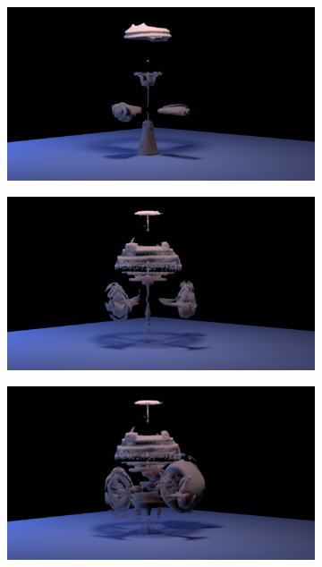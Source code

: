 \documentclass[11pt]{article}
\begin{document}
\begin{figure}
	\begin{subfigure}[h]{0.5\textwidth}
		\centering
		\includegraphics[width=\textwidth]{Figures/renders/plume0007.png}
	\end{subfigure}
	\begin{subfigure}[h]{0.5\textwidth}
		\centering
		\includegraphics[width=\textwidth]{Figures/renders/plume0008.png}
	\end{subfigure}
	\begin{subfigure}[h]{0.5\textwidth}
		\centering
		\includegraphics[width=\textwidth]{Figures/renders/plume0009.png}

\end{subfigure}
\end{figure}
\end{document}
